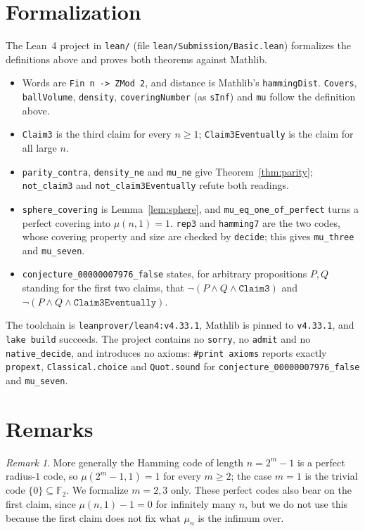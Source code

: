 \documentclass[11pt]{article}
\theoremstyle{plain}
\theoremstyle{definition}
\theoremstyle{remark}
\newtheorem{remark}[theorem]{Remark}
\newcommand{\F}{\mathbb F}
\begin{document}
\section{Formalization}

\sloppy
The Lean~4 project in \texttt{lean/} (file \texttt{lean/Submission/Basic.lean})
formalizes the definitions above and proves both theorems against Mathlib.
\begin{itemize}
  \item Words are \texttt{Fin n -> ZMod 2}, and distance is Mathlib's
    \texttt{hammingDist}. \texttt{Covers}, \texttt{ballVolume}, \texttt{density},
    \texttt{coveringNumber} (as \texttt{sInf}) and \texttt{mu} follow the definition
    above.
  \item \texttt{Claim3} is the third claim for every $n\ge1$;
    \texttt{Claim3Eventually} is the claim for all large $n$.
  \item \texttt{parity\_contra}, \texttt{density\_ne} and \texttt{mu\_ne} give
    Theorem~\ref{thm:parity}; \texttt{not\_claim3} and \texttt{not\_claim3Eventually}
    refute both readings.
  \item \texttt{sphere\_covering} is Lemma~\ref{lem:sphere}, and
    \texttt{mu\_eq\_one\_of\_perfect} turns a perfect covering into $\mu(n,1)=1$.
    \texttt{rep3} and \texttt{hamming7} are the two codes, whose covering property and
    size are checked by \texttt{decide}; this gives \texttt{mu\_three} and
    \texttt{mu\_seven}.
  \item \texttt{conjecture\_00000007976\_false} states, for arbitrary propositions
    $P,Q$ standing for the first two claims, that
    $\lnot(P\wedge Q\wedge\texttt{Claim3})$ and
    $\lnot(P\wedge Q\wedge\texttt{Claim3Eventually})$.
\end{itemize}
The toolchain is \texttt{leanprover/lean4:v4.33.1}, Mathlib is pinned to
\texttt{v4.33.1}, and \texttt{lake build} succeeds. The project contains no
\texttt{sorry}, no \texttt{admit} and no \texttt{native\_decide}, and introduces no
axioms: \texttt{\#print axioms} reports exactly \texttt{propext},
\texttt{Classical.choice} and \texttt{Quot.sound} for
\texttt{conjecture\_00000007976\_false} and \texttt{mu\_seven}.

\fussy
\section{Remarks}

\begin{remark}
More generally the Hamming code of length $n=2^m-1$ is a perfect radius-$1$ code, so
$\mu(2^m-1,1)=1$ for every $m\ge2$; the case $m=1$ is the trivial code
$\{0\}\subseteq\F_2$. We formalize $m=2,3$ only. These perfect codes also bear on the
first claim, since $\mu(n,1)-1=0$ for infinitely many $n$, but we do not use this
because the first claim does not fix what $\mu_n$ is the infimum over.
\end{remark}
\end{document}
